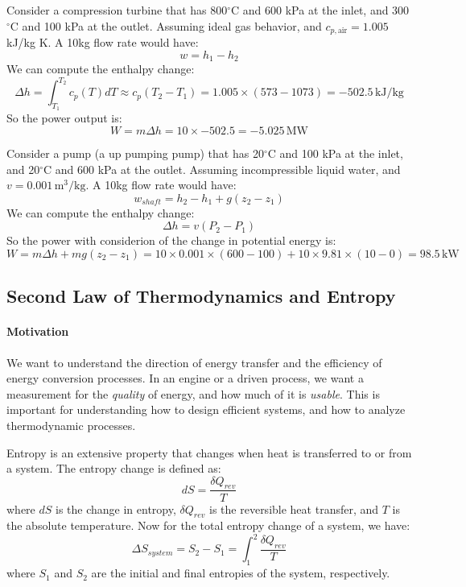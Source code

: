 \documentclass[11pt]{report}
\begin{document}
\begin{example}
    Consider a compression turbine that has 800$^\circ$C and 600 kPa at the inlet, and 300$^\circ$C and 100 kPa at the outlet. Assuming ideal gas behavior, and $c_{p, \text{air}} = 1.005$ kJ/kg K. A 10kg flow rate would have:
    $$
        w = h_1 - h_2 
    $$
    We can compute the enthalpy change:
    $$
        \Delta h = \int_{T_1}^{T_2} c_p(T) dT \approx c_p (T_2 - T_1) = 1.005 \times (573 - 1073) = -502.5\, \text{kJ/kg}
    $$
    So the power output is:
    $$
        W = m \Delta h = 10 \times -502.5 = -5.025\, \text{MW}
    $$
\end{example}

\begin{example}
    Consider a pump (a up pumping pump) that has 20$^\circ$C and 100 kPa at the inlet, and 20$^\circ$C and 600 kPa at the outlet. Assuming incompressible liquid water, and $v = 0.001\, \text{m}^3/\text{kg}$. A 10kg flow rate would have:
    $$
        w_{shaft} = h_2 - h_1 + g(z_2 - z_1)
    $$
    We can compute the enthalpy change:
    $$
        \Delta h = v (P_2 - P_1) 
    $$
    So the power with considerion of the change in potential energy is:
    $$
        W = m \Delta h + mg(z_2 - z_1) = 10 \times 0.001 \times (600 - 100) + 10 \times 9.81 \times (10 - 0) = 98.5\, \text{kW}
    $$
\end{example}

\subsection{Second Law of Thermodynamics and Entropy}
\paragraph{Motivation} We want to understand the direction of energy transfer and the efficiency of energy conversion processes. In an engine or a driven process, we want a measurement for the \textit{quality} of energy, and how much of it is \textit{usable}. This is important for understanding how to design efficient systems, and how to analyze thermodynamic processes.
\begin{definition}[Entropy]
    Entropy is an extensive property that changes when heat is transferred to or from a system. The entropy change is defined as:
    \begin{equation}
        dS = \frac{\delta Q_{rev}}{T}
    \end{equation}
    where $dS$ is the change in entropy, $\delta Q_{rev}$ is the reversible heat transfer, and $T$ is the absolute temperature. 
    Now for the total entropy change of a system, we have:
    \begin{equation}
        \Delta S_{system} = S_2 - S_1 = \int_{1}^{2} \frac{\delta Q_{rev}}{T}
    \end{equation}
    where $S_1$ and $S_2$ are the initial and final entropies of the system, respectively.
\end{definition}
\end{document}

